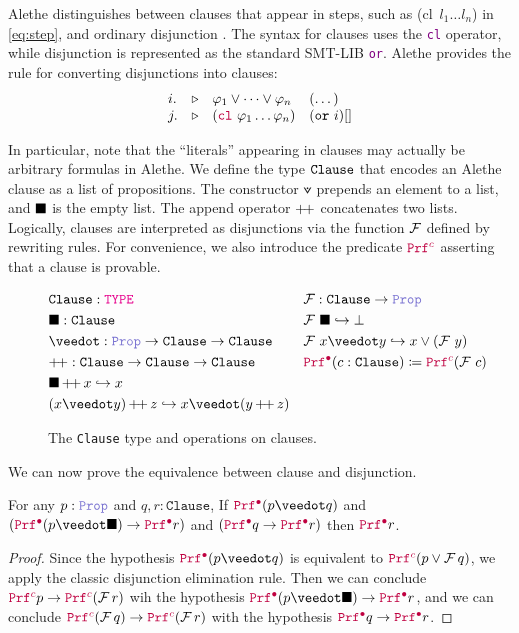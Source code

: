Alethe distinguishes between clauses that appear in steps, such as \colorbox{green!30}{(cl~$l_1 \dots l_n$)} in \cref{eq:step}, and ordinary disjunction \cite[\S 4]{alethespec}. The syntax for clauses uses the \textcolor{purple}{\texttt{cl}} operator, while disjunction is represented as the standard SMT-LIB \textcolor{purple}{\texttt{or}}.
Alethe provides the  rule for converting disjunctions into clauses:
\[
\begin{matrix*}[l]
  i. & \triangleright & \varphi_1 \lor \dots \lor \varphi_n  & (\dots) \\
  j. & \triangleright & (\texttt{\textcolor{purple}{cl}}~\varphi_1 \dots \varphi_n)  & (\kw{or}~i)[] \\
\end{matrix*}
\]

In particular, note that the ``literals'' appearing in clauses may actually be arbitrary formulas in Alethe. We define the type $\kw{Clause}$ that encodes an Alethe clause as a list of propositions. The constructor $\veedot$ prepends an element to a list, and $\nil$ is the empty list.
The append operator $\pp$ concatenates two lists. Logically, clauses are interpreted as disjunctions via the function $\cal{F}$ defined by rewriting rules. For convenience, we also introduce the predicate $\pic$ asserting that a clause is provable.

\begin{figure}
  \begin{align*}
  &\texttt{Clause}: \type & &\cal{F}: \texttt{Clause} \ra \prop \\
  &\nil: \texttt{Clause} & & \cal{F}~\nil \re \bot \\
  &\veedot: \prop \ra \texttt{Clause}  \ra \texttt{Clause} & & \cal{F}~x \veedot y \re x \lor (\cal{F}~y) \\
  & \pp: \texttt{Clause} \ra \texttt{Clause} \ra  \texttt{Clause} & &\pid (c : \texttt{Clause}) \coloneqq \pic (\cal{F}~c)  \\
  & \nil \mathop{\pp} x \re x & & \\
  & (x \veedot y) \mathop{\pp} z \re x \veedot (y \mathop{\pp} z) & &
  \end{align*}
  \caption{The \texttt{Clause} type and operations on clauses.}
\end{figure}

We can now prove the equivalence between clause and disjunction.

\smallskip

\begin{lemma}\label{lemma:clause-elim}
For any $p : \prop$ and $q,r : \texttt{Clause}$, If $\pid (p \veedot q)$ and $(\pid (p \veedot \nil) \ra  \pid r)$ and $(\pid q \ra  \pid r)$
then $\pid r$.
\end{lemma}
\begin{proof}
Since the hypothesis $\pid (p \veedot q)$ is equivalent to $\pic (p \lor \cal{F}\,q)$, we apply the classic disjunction elimination rule.
Then we can conclude $\pic p \ra \pic (\cal{F}\,r)$ wih the hypothesis $\pid (p \veedot \nil) \ra  \pid r$, and we can conclude $\pic (\cal{F}\,q) \ra \pic (\cal{F}\,r)$
with the hypothesis $\pid q \ra  \pid r$.
\end{proof}

